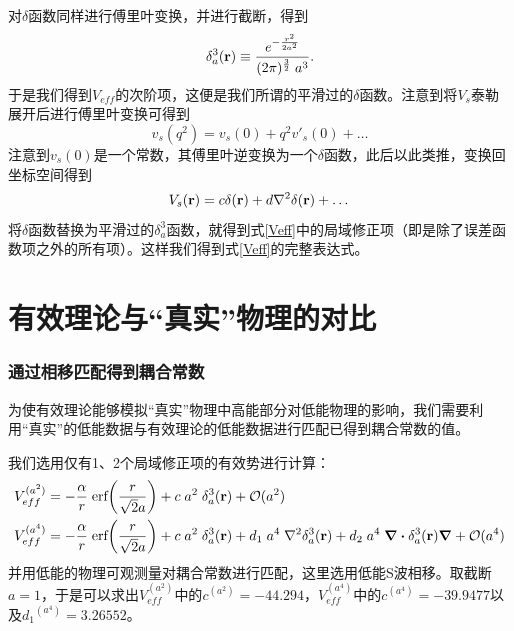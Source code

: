 \documentclass[8pt]{beamer}
\begin{document}
\begin{frame}
对$\delta$函数同样进行傅里叶变换，并进行截断，得到
\begin{equation}\label{smeardelta}
	\delta_a^3(\vb{r})\equiv\frac{e^{-\frac{r^2}{2a^2}}}{(2\pi)^{\frac{3}{2}}\;a^3}.
\end{equation}
于是我们得到$V_{eff}$的次阶项，这便是我们所谓的平滑过的$\delta$函数。注意到将$V_s$泰勒展开后进行傅里叶变换可得到
\begin{equation}\label{qtaylor}
	v_s(q^2)=v_s(0)+q^2v'_s(0)+\dots
\end{equation}
注意到$v_s(0)$是一个常数，其傅里叶逆变换为一个$\delta$函数，此后以此类推，变换回坐标空间得到
\begin{equation}\label{expand}
	V_s(\vb{r})=c\delta(\vb{r})+d\laplacian{\delta(\vb{r})}+\dots
\end{equation}
将$\delta$函数替换为平滑过的$\delta_a^3$函数，就得到式\eqref{Veff}中的局域修正项（即是除了误差函数项之外的所有项）。这样我们得到式\eqref{Veff}的完整表达式。
\end{frame}

\section{有效理论与“真实”物理的对比}
\begin{frame}
\frametitle{通过相移匹配得到耦合常数}
为使有效理论能够模拟“真实”物理中高能部分对低能物理的影响，我们需要利用“真实”的低能数据与有效理论的低能数据进行匹配已得到耦合常数的值。

我们选用仅有1、2个局域修正项的有效势进行计算：
\begin{align}
	\label{Veffa2}
	V_{eff}^{(a^2)} & =-\frac{\alpha}{r}\;\text{erf}\pqty{\frac{r}{\sqrt{2}a}}+c\; a^2\;\delta_a^3(\vb{r})+\mathcal{O}(a^2)                                                                                  \\
	\label{Veffa4}
	V_{eff}^{(a^4)} & =-\frac{\alpha}{r}\;\text{erf}\pqty{\frac{r}{\sqrt{2}a}}+c\; a^2\;\delta_a^3(\vb{r})+d_1\;a^4\;\laplacian{\delta_a^3(\vb{r})}+d_2\;a^4\;\div{\delta_a^3(\vb{r})}\grad+\mathcal{O}(a^4)
\end{align}
并用低能的物理可观测量对耦合常数进行匹配，这里选用低能S波相移。取截断$a=1$，于是可以求出$V_{eff}^{(a^2)}$中的$ c^{(a^2)}=-44.294$，$V_{eff}^{(a^4)}$中的$c^{(a^4)}=-39.9477$以及${d_1}^{(a^4)}=3.26552$。
\end{frame}
%
\end{document}
